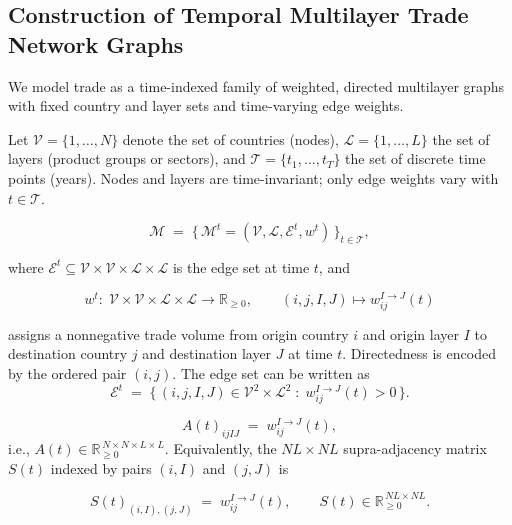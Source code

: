 \documentclass[preprint, 3p,
authoryear]{elsarticle} %
\begin{document}
\subsection{Construction of Temporal Multilayer Trade Network
Graphs}\label{sec:dynamicnet}

We model trade as a time-indexed family of weighted, directed multilayer
graphs with fixed country and layer sets and time-varying edge weights.

Let \(\mathcal{V}=\{1,\dots,N\}\) denote the set of countries (nodes),
\(\mathcal{L}=\{1,\dots,L\}\) the set of layers (product groups or
sectors), and \(\mathcal{T}=\{t_1,\dots,t_T\}\) the set of discrete time
points (years). Nodes and layers are time-invariant; only edge weights
vary with \(t\in\mathcal{T}\).

\begin{equation}
\mathcal{M} \;=\; \big\{\, \mathcal{M}^t = (\mathcal{V},\mathcal{L},\mathcal{E}^t,w^t) \,\big\}_{t\in\mathcal{T}},
\label{eq:temporal-family}
\end{equation}

\noindent where
\(\mathcal{E}^t \subseteq \mathcal{V}\times\mathcal{V}\times\mathcal{L}\times\mathcal{L}\)
is the edge set at time \(t\), and

\begin{equation}
w^t:\;\mathcal{V}\times\mathcal{V}\times\mathcal{L}\times\mathcal{L}\to \mathbb{R}_{\ge 0}, \qquad
(i,j,I,J)\mapsto w_{ij}^{I\to J}(t)
\label{eq:weight-function}
\end{equation}

\noindent assigns a nonnegative trade volume from origin country \(i\)
and origin layer \(I\) to destination country \(j\) and destination
layer \(J\) at time \(t\). Directedness is encoded by the ordered pair
\((i,j)\). The edge set can be written as \begin{equation}
\mathcal{E}^t \;=\; \big\{\, (i,j,I,J)\in \mathcal{V}^2\times \mathcal{L}^2 \;:\; w_{ij}^{I\to J}(t) > 0 \,\big\}.
\label{eq:edge-set}
\end{equation}

\begin{equation}
A(t)_{i j I J} \;=\; w_{ij}^{I\to J}(t),
\label{eq:adjacency-tensor}
\end{equation} i.e.,
\(A(t)\in \mathbb{R}_{\ge 0}^{\,N\times N\times L\times L}\).
Equivalently, the \(NL\times NL\) supra-adjacency matrix \(S(t)\)
indexed by pairs \((i,I)\) and \((j,J)\) is

\begin{equation}
S(t)_{(i,I),(j,J)} \;=\; w_{ij}^{I\to J}(t), \qquad S(t)\in \mathbb{R}_{\ge 0}^{\,NL\times NL}.
\label{eq:supra}
\end{equation}
\end{document}

